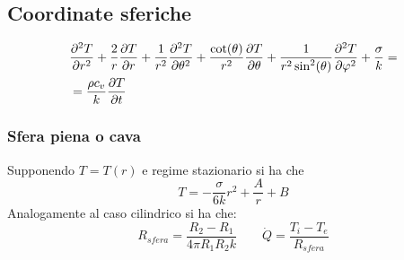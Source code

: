 \subsection{Coordinate sferiche}
\begin{align*}
    & \pdv[2]{T}{r} + \frac{2}{r}\pdv{T}{r} + \frac{1}{r^2}\pdv[2]{T}{\theta} + \frac{\cot(\theta)}{r^2}\pdv{T}{\theta} + \frac{1}{r^2 \sin^2(\theta)}\pdv[2]{T}{\varphi} + \frac{\sigma}{k} =\\
    & = \frac{\rho c_v}{k} \pdv{T}{t}
\end{align*}

\subsubsection{Sfera piena o cava}
Supponendo $T = T(r)$ e regime stazionario si ha che
\[ T = -\frac{\sigma}{6k}r^2 + \frac{A}{r} + B \]
Analogamente al caso cilindrico si ha che:
\[ R_{sfera} = \frac{R_2 - R_1}{4\pi R_1 R_2 k} \qquad \dot{Q} = \frac{T_i-T_e}{R_{sfera}} \]
